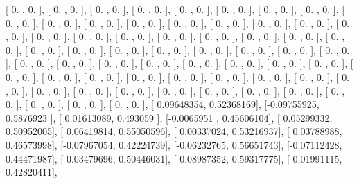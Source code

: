 \documentclass{article}
\begin{document}
       [ 0.        ,  0.        ],
       [ 0.        ,  0.        ],
       [ 0.        ,  0.        ],
       [ 0.        ,  0.        ],
       [ 0.        ,  0.        ],
       [ 0.        ,  0.        ],
       [ 0.        ,  0.        ],
       [ 0.        ,  0.        ],
       [ 0.        ,  0.        ],
       [ 0.        ,  0.        ],
       [ 0.        ,  0.        ],
       [ 0.        ,  0.        ],
       [ 0.        ,  0.        ],
       [ 0.        ,  0.        ],
       [ 0.        ,  0.        ],
       [ 0.        ,  0.        ],
       [ 0.        ,  0.        ],
       [ 0.        ,  0.        ],
       [ 0.        ,  0.        ],
       [ 0.        ,  0.        ],
       [ 0.        ,  0.        ],
       [ 0.        ,  0.        ],
       [ 0.        ,  0.        ],
       [ 0.        ,  0.        ],
       [ 0.        ,  0.        ],
       [ 0.        ,  0.        ],
       [ 0.        ,  0.        ],
       [ 0.        ,  0.        ],
       [ 0.        ,  0.        ],
       [ 0.        ,  0.        ],
       [ 0.        ,  0.        ],
       [ 0.        ,  0.        ],
       [ 0.        ,  0.        ],
       [ 0.        ,  0.        ],
       [ 0.        ,  0.        ],
       [ 0.        ,  0.        ],
       [ 0.        ,  0.        ],
       [ 0.        ,  0.        ],
       [ 0.        ,  0.        ],
       [ 0.        ,  0.        ],
       [ 0.        ,  0.        ],
       [ 0.        ,  0.        ],
       [ 0.        ,  0.        ],
       [ 0.        ,  0.        ],
       [ 0.        ,  0.        ],
       [ 0.        ,  0.        ],
       [ 0.        ,  0.        ],
       [ 0.        ,  0.        ],
       [ 0.        ,  0.        ],
       [ 0.        ,  0.        ],
       [ 0.        ,  0.        ],
       [ 0.        ,  0.        ],
       [ 0.        ,  0.        ],
       [ 0.        ,  0.        ],
       [ 0.        ,  0.        ],
       [ 0.        ,  0.        ],
       [ 0.        ,  0.        ],
       [ 0.        ,  0.        ],
       [ 0.        ,  0.        ],
       [ 0.        ,  0.        ],
       [ 0.        ,  0.        ],
       [ 0.09648354,  0.52368169],
       [-0.09755925,  0.5876923 ],
       [ 0.01613089,  0.493059  ],
       [-0.0065951 ,  0.45606104],
       [ 0.05299332,  0.50952005],
       [ 0.06419814,  0.55050596],
       [ 0.00337024,  0.53216937],
       [ 0.03788988,  0.46573998],
       [-0.07967054,  0.42224739],
       [-0.06232765,  0.56651743],
       [-0.07112428,  0.44471987],
       [-0.03479696,  0.50446031],
       [-0.08987352,  0.59317775],
       [ 0.01991115,  0.42820411],
\end{document}
